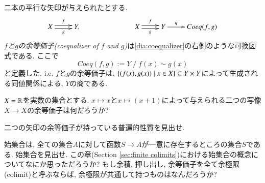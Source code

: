 \begin{definition}[余等価子]\label{def:coequalizer}

二本の平行な矢印が与えられたとする.
\begin{align}\label{dia:coequalizer}
\xymatrix{X\ar@<.5ex>[r]^f\ar@<-.5ex>[r]_g&Y.}\hspace{1in}\xymatrix{X\ar@<.5ex>[r]^f\ar@<-.5ex>[r]_g&Y\ar[r]^-q&Coeq(f,g)}
\end{align}
\emph{$f$と$g$の余等価子(coequalizer of $f$ and $g$)}は\eqref{dia:coequalizer}の右側のような可換図式である. ここで$$Coeq(f,g):=Y\;/\;f(x)\sim g(x)$$と定義した. i.e. $f$と$g$の余等価子は, $\{(f(x),g(x))\|x\in X\}\ss Y\times Y$によって生成される同値関係による, $Y$の商である.

\end{definition}

\begin{exercise}
$X=\RR$を実数の集合とする. $x\mapsto x$と$x\mapsto (x+1)$によって与えられる二つの写像$X\to X$の余等価子は何だろうか?
\end{exercise}

\begin{exercise}
二つの矢印の余等価子が持っている普遍的性質を見出せ.
\end{exercise}

\begin{exercise}\label{exc:initial set}
始集合は, 全ての集合$A$に対して函数$S\to A$が一意に存在するところの集合$S$である.
\sexc 始集合を見出せ.
\next この章(Section \ref{sec:finite colimits})における始集合の概念についてなにか思っただろうか? もし余積, 押し出し, 余等価子を全て余極限(colimit)と呼ぶならば, 余極限が共通して持つものはなんだろうか?
\endsexc
\end{exercise}


